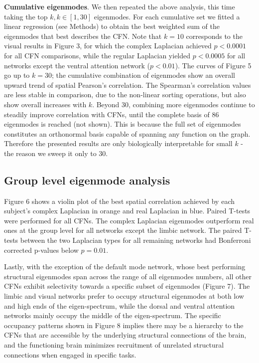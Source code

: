 \documentclass{article}
\begin{document}
\textbf{ Cumulative eigenmodes}. We then repeated the above analysis, this time taking the top $k, k\in [1,30]$ eigenmodes. For each cumulative set we fitted a linear regression (see Methods) to obtain the best weighted sum of the eigenmodes that best describes the CFN. Note that $k=10$ corresponds to the visual results in Figure 3, for which the complex Laplacian achieved $p<0.0001$ for all CFN comparisons, while the regular Laplacian yielded $p<0.0005$ for all networks except the ventral attention network ($p<0.01$). The curves of Figure 5 go up to $k=30$; the cumulative combination of eigenmodes show an overall upward trend of spatial Pearson's correlation. The Spearman's correlation values are less stable in comparison, due to the non-linear sorting operations, but also show overall increases with $k$. Beyond 30, combining more eigenmodes continue to steadily improve correlation with CFNs, until the complete basis of 86 eigenmodes is reached (not shown). This is because the full set of eigenmodes constitutes an orthonormal basis capable of spanning any function on the graph. Therefore the presented results are only biologically interpretable for small $k$ - the reason we sweep it only to 30.

\subsection{Group level eigenmode analysis}
Figure 6 shows a violin plot of the best spatial correlation achieved by each subject's complex Laplacian in orange and real Laplacian in blue. Paired T-tests were performed for all CFNs. The complex Laplacian eigenmodes outperform real ones at the group level for all networks except the limbic network. The paired T-tests between the two Laplacian types for all remaining networks had Bonferroni corrected p-values below $p = 0.01$.

Lastly, with the exception of the default mode network, whose best performing structural eigenmodes span across the range of all eigenmodes numbers, all other CFNs exhibit selectivity towards a specific subset of eigenmodes (Figure 7). The limbic and visual networks prefer to occupy structural eigenmodes at both low and high ends of the eigen-spectrum, while the dorsal and ventral attention networks mainly occupy the middle of the eigen-spectrum. The specific occupancy patterns shown in Figure 8 implies there may be a hierarchy to the CFNs that are accessible by the underlying structural connections of the brain, and the functioning brain minimizes recruitment of unrelated structural connections when engaged in specific tasks.
\end{document}
